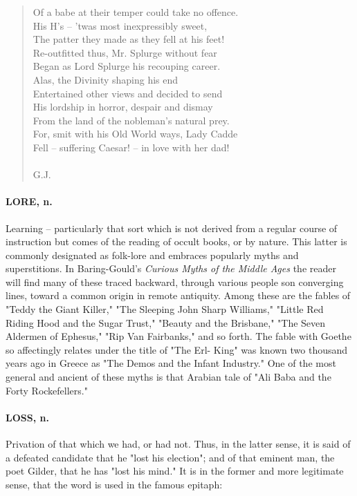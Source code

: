 \documentclass[11pt]{article}
\begin{document}
\begin{quote}
  Of a babe at their temper could take no offence. \\
  His H's -- 'twas most inexpressibly sweet, \\
  The patter they made as they fell at his feet! \\
  Re-outfitted thus, Mr. Splurge without fear \\
  Began as Lord Splurge his recouping career. \\
  Alas, the Divinity shaping his end \\
  Entertained other views and decided to send \\
  His lordship in horror, despair and dismay \\
  From the land of the nobleman's natural prey. \\
  For, smit with his Old World ways, Lady Cadde \\
  Fell -- suffering Caesar! -- in love with her dad! \\
 \\
G.J. \end{quote}


\paragraph{LORE, n.}  Learning -- particularly that sort which is not derived from
a regular course of instruction but comes of the reading of occult
books, or by nature.  This latter is commonly designated as folk-lore
and embraces popularly myths and superstitions.  In Baring-Gould's
{\em Curious Myths of the Middle Ages} the reader will find many of these
traced backward, through various people son converging lines, toward a
common origin in remote antiquity.  Among these are the fables of
"Teddy the Giant Killer," "The Sleeping John Sharp Williams," "Little
Red Riding Hood and the Sugar Trust," "Beauty and the Brisbane," "The
Seven Aldermen of Ephesus," "Rip Van Fairbanks," and so forth.  The
fable with Goethe so affectingly relates under the title of "The Erl-
King" was known two thousand years ago in Greece as "The Demos and the
Infant Industry."  One of the most general and ancient of these myths
is that Arabian tale of "Ali Baba and the Forty Rockefellers."

\paragraph{LOSS, n.}  Privation of that which we had, or had not.  Thus, in the
latter sense, it is said of a defeated candidate that he "lost his
election"; and of that eminent man, the poet Gilder, that he has "lost
his mind."  It is in the former and more legitimate sense, that the
word is used in the famous epitaph:
\end{document}

